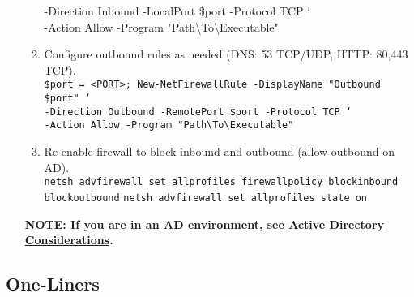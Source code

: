 \documentclass[12pt,letterpaper]{article}
\def\code#1{\textcolor{iris}{\texttt{#1}}}
\def\bf#1{\textbf{#1}}
\begin{document}
\begin{enumerate}
\begin{enumerate}
{				-Direction Inbound -LocalPort \$port -Protocol TCP ` \\
				-Action Allow -Program "Path\textbackslash{}To\textbackslash{}Executable"}
			\item Configure outbound rules as needed (DNS: 53 TCP/UDP, HTTP: 80,443 TCP). \\
				\code{\$port = <PORT>; New-NetFirewallRule -DisplayName "Outbound \$port" ` \\
				-Direction Outbound -RemotePort \$port -Protocol TCP ` \\
				-Action Allow -Program "Path\textbackslash{}To\textbackslash{}Executable"}
			\item Re-enable firewall to block inbound and outbound (allow outbound on AD). \\
				\code{netsh advfirewall set allprofiles firewallpolicy blockinbound blockoutbound}
				\code{netsh advfirewall set allprofiles state on}
		\end{enumerate}
	\bf{NOTE: If you are in an AD environment, see \hyperref[subsec:adcon]{Active Directory Considerations}.}
\end{enumerate}

\pagebreak

\subsection{One-Liners}
\label{subsec:woliner}
\end{document}
